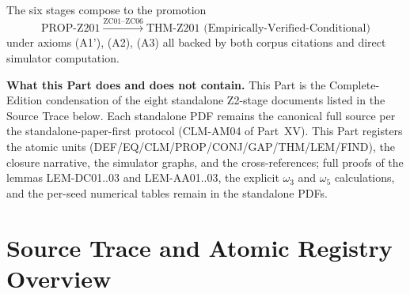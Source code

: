 \documentclass[12pt, a4paper]{article}
\begin{document}
The six stages compose to the promotion
\[
  \text{PROP-Z201}
  \;\xrightarrow{\text{ZC01--ZC06}}\;
  \text{THM-Z201 (Empirically-Verified-Conditional)}
\]
under axioms (A1'), (A2), (A3) all backed by both corpus citations
and direct simulator computation.

\smallskip
\textbf{What this Part does and does not contain.} This Part is the
Complete-Edition condensation of the eight standalone Z2-stage
documents listed in the Source Trace below. Each standalone PDF
remains the canonical full source per the standalone-paper-first
protocol (CLM-AM04 of Part~XV). This Part registers the atomic
units (DEF/EQ/CLM/PROP/CONJ/GAP/THM/LEM/FIND), the closure
narrative, the simulator graphs, and the cross-references; full
proofs of the lemmas LEM-DC01..03 and LEM-AA01..03, the explicit
$\omega_3$ and $\omega_5$ calculations, and the per-seed numerical
tables remain in the standalone PDFs.

\section{Source Trace and Atomic Registry Overview}
\label{sec:Z2-source-trace}
\end{document}
